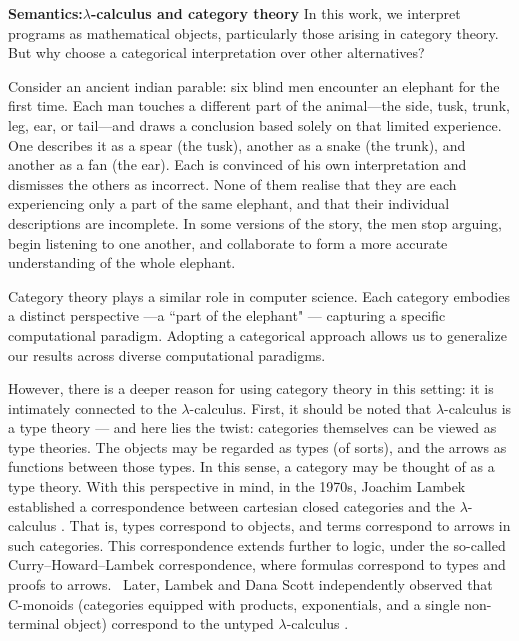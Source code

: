 

\noindent \textbf{Semantics:$\lambda$-calculus and category theory} In this work, we interpret programs as mathematical objects, particularly those arising in category theory. But why choose a categorical interpretation over other alternatives?

Consider an ancient indian parable: six blind men encounter an elephant for the first time. Each man touches a different part of the animal—the side, tusk, trunk, leg, ear, or tail—and draws a conclusion based solely on that limited experience. One describes it as a spear (the tusk), another as a snake (the trunk), and another as a fan (the ear). Each is convinced of his own interpretation and dismisses the others as incorrect. None of them realise that they are each experiencing only a part of the same elephant, and that their individual descriptions are incomplete. In some versions of the story, the men stop arguing, begin listening to one another, and collaborate to form a more accurate understanding of the whole elephant. 

Category theory plays a similar role in computer science. Each category embodies a distinct perspective ---a ``part of the elephant" --- capturing a specific computational paradigm. Adopting a categorical approach allows us to generalize our results across diverse computational paradigms.


However, there is a deeper reason for using category theory in this setting: it is intimately connected to the $\lambda$-calculus. First, it should be noted that $\lambda$-calculus is a type theory --- and here lies the twist: categories themselves can be viewed as type theories. The objects may be regarded as types (of sorts), and the arrows as functions between those types. In this sense, a category may be thought of as a type theory. With this perspective in mind, in the 1970s, Joachim Lambek established a correspondence between cartesian closed categories and the $\lambda$-calculus \cite{lambek1980lambda}. That is, types correspond to objects, and terms correspond to arrows in such categories. This correspondence extends further to logic, under the so-called Curry–Howard–Lambek correspondence, where formulas correspond to types and proofs to arrows.  Later, Lambek and Dana Scott independently observed that C-monoids (\ie categories equipped with products, exponentials, and a single non-terminal object) correspond to the untyped $\lambda$-calculus \cite{lambekscott988}.





